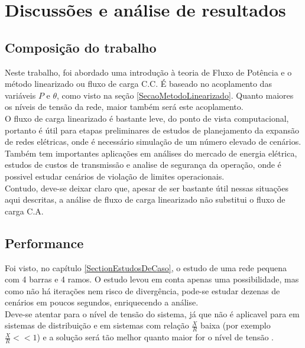 \chapter{Discussões e an\'alise de resultados}
\section{Composição do trabalho}
Neste trabalho, foi abordado uma introdução à teoria de Fluxo de Potência e o método linearizado ou fluxo de carga C.C. É baseado no acoplamento das variáveis $P$ e $\theta$, como visto na seção \ref{SecaoMetodoLinearizado}. Quanto maiores os níveis de tensão da rede, maior também será este acoplamento.\\
O fluxo de carga linearizado é bastante leve, do ponto de vista computacional, portanto é útil para etapas preliminares de estudos de planejamento da expansão de redes elétricas, onde é necessário simulação de um número elevado de cenários. \\
Também tem importantes aplicações em análises do mercado de energia elétrica, estudos de custos de transmissão e analise de segurança da operação, onde é possivel estudar cenários de violação de limites operacionais.\\
Contudo, deve-se deixar claro que, apesar de ser bastante útil nessas situações aqui descritas, a análise de fluxo de carga linearizado não substitui o fluxo de carga C.A.
\section{Performance}
Foi visto, no capítulo \ref{SectionEstudosDeCaso}, o estudo de uma rede pequena com 4 barras e 4 ramos. O estudo levou em conta apenas uma possibilidade, mas como não há iterações nem risco de divergência, pode-se estudar dezenas de cenários em poucos segundos, enriquecendo a análise.\\
Deve-se atentar para o nível de tensão do sistema, já que não é aplicavel para em sistemas de distribuição e em sistemas com relação $\frac{X}{R}$ baixa (por exemplo $\frac{X}{R} << 1$) e a solução será tão melhor quanto maior for o nível de tensão \cite{raphael}.
